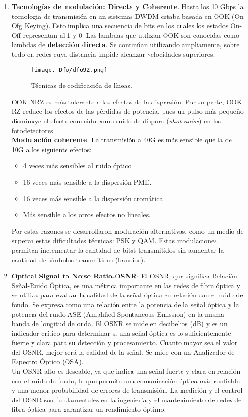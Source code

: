 \documentclass[
	12pt, %
	fleqn, %
	a4paper, %
	oneside, %
]{LegrandOrangeBook}
\begin{document}
\begin{enumerate}
\item \textbf{Tecnologías de modulación: Directa y Coherente}. Hasta los 10 Gbps la tecnologia de transmisión en un sistemas DWDM estaba basada en OOK (On Ofg Keying). Esto implica una secuencia de bits en los cuales los estados On-Off representan al 1 y 0. Las lambdas que utilizan OOK son conocidas como lambdas de \textbf{detección directa}. Se continúan utilizando ampliamente, sobre todo en redes cuya distancia impide alcanzar velocidades superiores.
\begin{figure}[H]
\centering
\texttt{[image: Dfo/dfo92.png]}
\caption{Técnicas de codificación de líneas.}
\end{figure}
OOK-NRZ es más tolerante a los efectos de la dispersión. Por su parte, OOK-RZ reduce los efectos de las pérdidas de potencia, pues un pulso más pequeño disminuye el efecto conocido como ruido de disparo (\textit{shot noise}) en los fotodetectores.\\
\textbf{Modulación coherente}. La transmisión a 40G es más sensible que la de 10G a los siguiente efectos:
\begin{itemize}
\item 4 veces más sensibles al ruido óptico.
\item 16 veces más sensible a la dispersión PMD.
\item 16 veces más sensible a la dispersión cromática.
\item Más sensible a los otros efectos no lineales.
\end{itemize}
Por estas razones se desarrollaron modulación alternativas, como un medio de superar estas dificultades técnicas: PSK y QAM. Estas modulaciones permiten incrementar la cantidad de bitst transmitidos sin aumentar la cantidad de símbolos transmitidos (baudios).
\item \textbf{Optical Signal to Noise Ratio-OSNR}: El OSNR, que significa Relación Señal-Ruido Óptica, es una métrica importante en las redes de fibra óptica y se utiliza para evaluar la calidad de la señal óptica en relación con el ruido de fondo. Se expresa como una relación entre la potencia de la señal óptica y la potencia del ruido ASE (Amplified Spontaneous Emission) en la misma banda de longitud de onda. El OSNR se mide en decibelios (dB) y es un indicador crítico para determinar si una señal óptica es lo suficientemente fuerte y clara para su detección y procesamiento. Cuanto mayor sea el valor del OSNR, mejor será la calidad de la señal. Se mide con un Analizador de Espectro Óptico (OSA).\\
Un OSNR alto es deseable, ya que indica una señal fuerte y clara en relación con el ruido de fondo, lo que permite una comunicación óptica más confiable y una menor probabilidad de errores de transmisión. La medición y el control del OSNR son fundamentales en la ingeniería y el mantenimiento de redes de fibra óptica para garantizar un rendimiento óptimo.


\end{enumerate}
\end{document}
